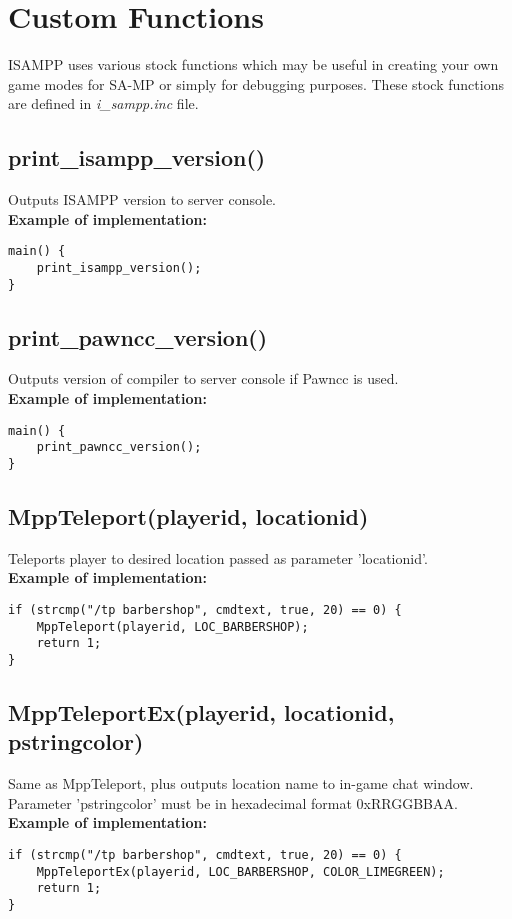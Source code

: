 \documentclass{article}
\begin{document}
\newpage
\section{Custom Functions}
ISAMPP uses various stock functions which may be useful in creating your own game modes for SA-MP or simply for debugging purposes. These stock functions are defined in \textit{i\_sampp.inc} file.


\subsection{print\_isampp\_version()}
Outputs ISAMPP version to server console.
\bigskip
\\\textbf{Example of implementation:}
\begin{verbatim}
main() {
    print_isampp_version();
}
\end{verbatim}


\subsection{print\_pawncc\_version()}
Outputs version of compiler to server console if Pawncc is used.
\bigskip
\\\textbf{Example of implementation:}
\begin{verbatim}
main() {
    print_pawncc_version();
}
\end{verbatim}


\subsection{MppTeleport(playerid, locationid)}
Teleports player to desired location passed as parameter 'locationid'.
\bigskip
\\\textbf{Example of implementation:}
\begin{verbatim}
if (strcmp("/tp barbershop", cmdtext, true, 20) == 0) {
    MppTeleport(playerid, LOC_BARBERSHOP);
    return 1;
}
\end{verbatim}


\subsection{MppTeleportEx(playerid, locationid, pstringcolor)}
Same as MppTeleport, plus outputs location name to in-game chat window. \\Parameter 'pstringcolor' must be in hexadecimal format 0xRRGGBBAA.
\bigskip
\\\textbf{Example of implementation:}
\begin{verbatim}
if (strcmp("/tp barbershop", cmdtext, true, 20) == 0) {
    MppTeleportEx(playerid, LOC_BARBERSHOP, COLOR_LIMEGREEN);
    return 1;
}
\end{verbatim}
\end{document}

